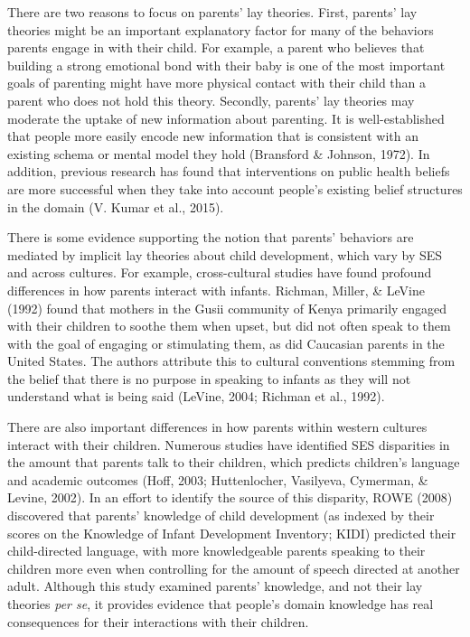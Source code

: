 \documentclass[10pt, letterpaper]{article}
\begin{document}
There are two reasons to focus on parents' lay theories. First, parents'
lay theories might be an important explanatory factor for many of the
behaviors parents engage in with their child. For example, a parent who
believes that building a strong emotional bond with their baby is one of
the most important goals of parenting might have more physical contact
with their child than a parent who does not hold this theory. Secondly,
parents' lay theories may moderate the uptake of new information about
parenting. It is well-established that people more easily encode new
information that is consistent with an existing schema or mental model
they hold (Bransford \& Johnson, 1972). In addition, previous research
has found that interventions on public health beliefs are more
successful when they take into account people's existing belief
structures in the domain (V. Kumar et al., 2015).

There is some evidence supporting the notion that parents' behaviors are
mediated by implicit lay theories about child development, which vary by
SES and across cultures. For example, cross-cultural studies have found
profound differences in how parents interact with infants. Richman,
Miller, \& LeVine (1992) found that mothers in the Gusii community of
Kenya primarily engaged with their children to soothe them when upset,
but did not often speak to them with the goal of engaging or stimulating
them, as did Caucasian parents in the United States. The authors
attribute this to cultural conventions stemming from the belief that
there is no purpose in speaking to infants as they will not understand
what is being said (LeVine, 2004; Richman et al., 1992).

There are also important differences in how parents within western
cultures interact with their children. Numerous studies have identified
SES disparities in the amount that parents talk to their children, which
predicts children's language and academic outcomes (Hoff, 2003;
Huttenlocher, Vasilyeva, Cymerman, \& Levine, 2002). In an effort to
identify the source of this disparity, ROWE (2008) discovered that
parents' knowledge of child development (as indexed by their scores on
the Knowledge of Infant Development Inventory; KIDI) predicted their
child-directed language, with more knowledgeable parents speaking to
their children more even when controlling for the amount of speech
directed at another adult. Although this study examined parents'
knowledge, and not their lay theories \emph{per se}, it provides
evidence that people's domain knowledge has real consequences for their
interactions with their children.
\end{document}
